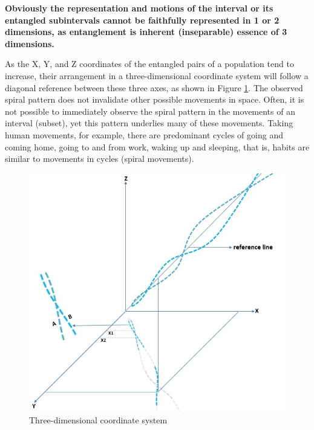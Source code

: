 \textbf{Obviously the representation and motions of the interval or its entangled subintervals cannot be faithfully represented in 1 or 2 dimensions, as entanglement is inherent (inseparable) essence of 3 dimensions.}

As the X, Y, and Z coordinates of the entangled pairs of a population tend to increase, their arrangement in a three-dimensional coordinate system will follow a diagonal reference between these three axes, as shown in Figure \ref{fig:consciousness_space_spiral_reference_line}. The observed spiral pattern does not invalidate other possible movements in space. Often, it is not possible to immediately observe the spiral pattern in the movements of an interval (subset), yet this pattern underlies many of these movements.  Taking human movements, for example, there are predominant cycles of going and coming home, going to and from work, waking up and sleeping, that is, habits are similar to movements in cycles (spiral movements).
	\begin{figure}[H]
	\caption{Three-dimensional coordinate system}
	\label{fig:consciousness_space_spiral_reference_line}
	\centering
	\includegraphics[scale=.6]{sections/images/consciousness_space_spiral_reference_line.jpg}
	\end{figure}

